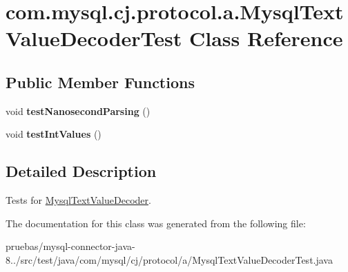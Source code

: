 \hypertarget{classcom_1_1mysql_1_1cj_1_1protocol_1_1a_1_1_mysql_text_value_decoder_test}{}\section{com.\+mysql.\+cj.\+protocol.\+a.\+Mysql\+Text\+Value\+Decoder\+Test Class Reference}
\label{classcom_1_1mysql_1_1cj_1_1protocol_1_1a_1_1_mysql_text_value_decoder_test}
\subsection*{Public Member Functions}
\begin{DoxyCompactItemize}
\item 
\mbox{\label{classcom_1_1mysql_1_1cj_1_1protocol_1_1a_1_1_mysql_text_value_decoder_test_a7df8b20eb57045aee4e632d53302fe6a}} 
void {\bfseries test\+Nanosecond\+Parsing} ()
\item 
\mbox{\label{classcom_1_1mysql_1_1cj_1_1protocol_1_1a_1_1_mysql_text_value_decoder_test_a6269c60ceb2adcaf8ac7d887853f11e2}} 
void {\bfseries test\+Int\+Values} ()
\end{DoxyCompactItemize}


\subsection{Detailed Description}
Tests for \mbox{\hyperlink{classcom_1_1mysql_1_1cj_1_1protocol_1_1a_1_1_mysql_text_value_decoder}{Mysql\+Text\+Value\+Decoder}}. 

The documentation for this class was generated from the following file\+:\begin{DoxyCompactItemize}
\item 
pruebas/mysql-\/connector-\/java-\/8../src/test/java/com/mysql/cj/protocol/a/Mysql\+Text\+Value\+Decoder\+Test.\+java\end{DoxyCompactItemize}

